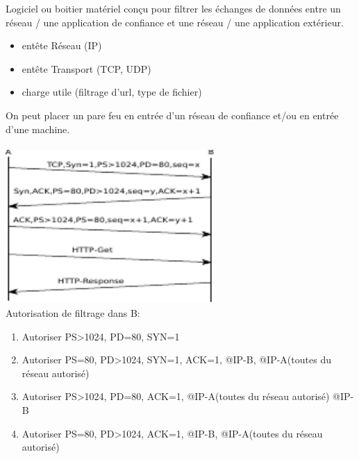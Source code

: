  Logiciel ou boitier matériel conçu pour filtrer les échanges de données entre un réseau / une application de confiance et une réseau / une application extérieur. \\

	\begin{itemize}
		\item entête Réseau (IP)
		\item entête Transport (TCP, UDP)
		\item charge utile (filtrage d'url, type de fichier)
	\end{itemize}
On peut placer un pare feu en entrée d'un réseau de confiance et/ou en entrée d'une machine.\\

 \\
\includegraphics[width=300px]{Images/17_Http.pdf} \\
Autorisation de filtrage dans B:
\begin{enumerate}
	\item Autoriser PS>1024, PD=80, SYN=1
	\item Autoriser PS=80, PD>1024, SYN=1, ACK=1, @IP-B, @IP-A(toutes du réseau autorisé) 
	\item Autoriser PS>1024, PD=80, ACK=1, @IP-A(toutes du réseau autorisé) @IP-B
	\item Autoriser PS=80, PD>1024, ACK=1, @IP-B, @IP-A(toutes du réseau autorisé) 
\end{enumerate}


